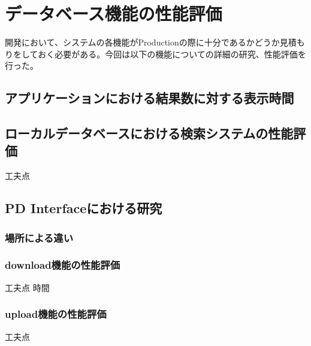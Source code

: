 \chapter{データベース機能の性能評価}

開発において、システムの各機能がProductionの際に十分であるかどうか見積もりをしておく必要がある。今回は以下の機能についての詳細の研究、性能評価を行った。

\section{アプリケーションにおける結果数に対する表示時間}

\section{ローカルデータベースにおける検索システムの性能評価}
工夫点

\section{PD Interfaceにおける研究}
\subsection{場所による違い}
\subsection{download機能の性能評価}
工夫点
時間
\subsection{upload機能の性能評価}
工夫点

